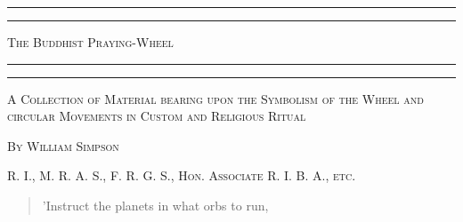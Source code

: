 \documentclass[a4paper, 11pt, oneside, polutonikogreek, english]{article}
\begin{document}
\begin{titlepage} %
	\centering %

	
	\rule{\textwidth}{1.6pt}\vspace*{-\baselineskip}\vspace*{2pt} %
	\rule{\textwidth}{0.4pt} %
	
	\vspace{1\baselineskip} %
	
	{\scshape\Huge The Buddhist Praying-Wheel}
	
	\vspace{1\baselineskip} %

	\rule{\textwidth}{0.4pt}\vspace*{-\baselineskip}\vspace{3.2pt} %
	\rule{\textwidth}{1.6pt} %
	
	\vspace{1\baselineskip} %
	
	
	{\scshape \normalsize A Collection of Material bearing upon the Symbolism of the Wheel and circular Movements in Custom and Religious Ritual}

    	\vspace*{1\baselineskip} %

	{\scshape By \Large William Simpson} %
	
	\vspace*{1\baselineskip} %
	
    {\scshape\scriptsize R. I., M. R. A. S., F. R. G. S., Hon. Associate R. I. B. A., etc.} %
  

    \vspace{1\baselineskip}

        \begin{quotation}\normalsize
'Instruct the planets in what orbs to run,


\end{quotation}
\end{titlepage}
\end{document}
